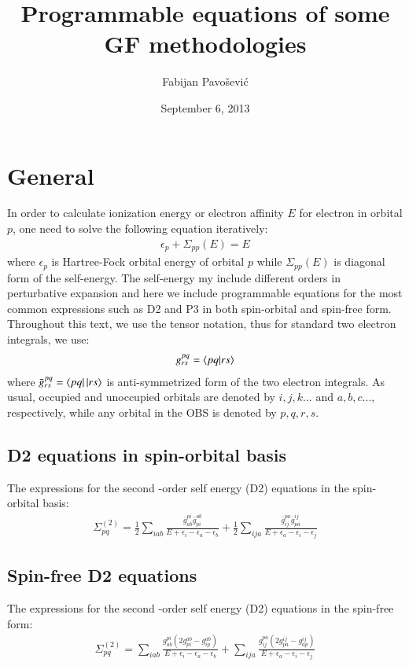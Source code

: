 \documentclass[journal=jacsat]{achemso}
\author{Fabijan Pavo\v{s}evi\'{c}}
\affiliation[Virginia Tech]
       {Department of Chemistry, Virginia Tech, Blacksburg, VA}
\title{Programmable equations of some GF methodologies}
\date{September 6, 2013}
\numberwithin{equation}{section}
\begin{document}
\maketitle
\newpage
\tableofcontents
\newpage
\section{General}
In order to calculate ionization energy or electron affinity $E$ for electron in orbital $p$, one need to solve the following equation iteratively:
\begin{align}
\epsilon_{p} + \Sigma_{pp}(E) = E
\end{align}
where $\epsilon_{p}$ is Hartree-Fock orbital energy of orbital $p$ while $\Sigma_{pp}(E)$ is diagonal form of the self-energy. The self-energy my include different orders in perturbative expansion and here we include programmable equations for the most common expressions such as D2 and P3 in both spin-orbital and spin-free form. Throughout this text, we use the tensor notation, thus for standard two electron integrals, we use:
\begin{align}
g^{pq}_{rs} = \braket{pq|rs}
\end{align}
where $\bar{g}^{pq}_{rs} = \bra{pq}\ket{rs}$ is anti-symmetrized form of the two electron integrals.
As usual, occupied and unoccupied orbitals are denoted by $i,j,k...$ and $a,b,c...$, respectively, while any orbital in the OBS is denoted by $p,q,r,s$.

\subsection{D2 equations in spin-orbital basis}
The expressions for the second -order self energy (D2) equations in the spin-orbital basis:
\begin{align}
\Sigma_{pq}^{(2)} = \frac{1}{2}\sum_{iab}\frac{\bar{g}^{pi}_{ab}\bar{g}^{ab}_{pi}}{E + \epsilon_{i}-\epsilon_{a}-\epsilon_{b}}+
\frac{1}{2}\sum_{ija}\frac{\bar{g}^{pa}_{ij}\bar{g}^{ij}_{pa}}{E + \epsilon_{a}-\epsilon_{i}-\epsilon_{j}}
\end{align}

\subsection{Spin-free D2 equations}
The expressions for the second -order self energy (D2) equations in the spin-free form:
\begin{align}
\Sigma_{pq}^{(2)} = \sum_{iab}\frac{g^{pi}_{ab}(2g^{ab}_{pi}-g^{ab}_{ip})}{E + \epsilon_{i}-\epsilon_{a}-\epsilon_{b}}+
\sum_{ija}\frac{g^{pa}_{ij}(2g^{ij}_{pa}-g^{ij}_{ap})}{E + \epsilon_{a}-\epsilon_{i}-\epsilon_{j}}
\end{align}
\end{document}
